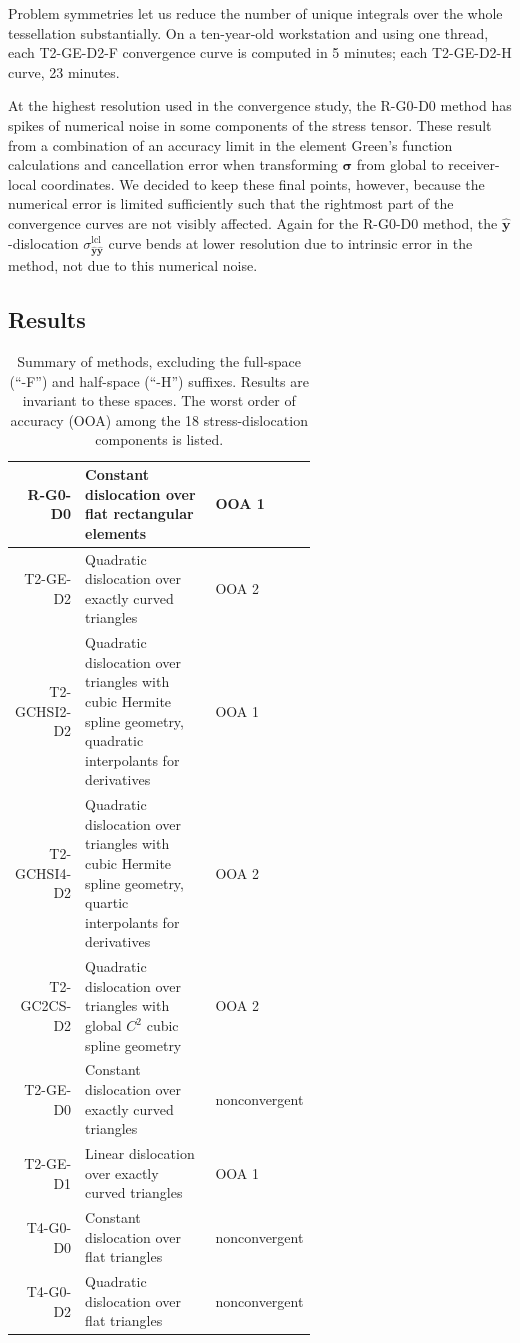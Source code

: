 \documentclass[11pt]{article}
\newcommand{\uvec}[1]{\hat{\boldsymbol{#1}}}
\newcommand{\mat}[1]{\boldsymbol{#1}}
\newcommand{\suplcl}[1]{#1^{\mathrm{lcl}}}
\begin{document}
Problem symmetries let us reduce the number of unique integrals
over the whole tessellation substantially.
On a ten-year-old workstation and using one thread,
each T2-GE-D2-F convergence curve is computed in 5 minutes;
each T2-GE-D2-H curve, 23 minutes.

At the highest resolution used in the convergence study,
the R-G0-D0 method has spikes of numerical noise in some components of the stress tensor.
These result from a combination of an accuracy limit in the element Green's function calculations
and cancellation error when transforming $\mat{\sigma}$ from global to receiver-local coordinates.
We decided to keep these final points, however,
because the numerical error is limited sufficiently such that
the rightmost part of the convergence curves are not visibly affected.
Again for the R-G0-D0 method,
the $\uvec{y}$-dislocation $\suplcl{\sigma}_{\uvec{y}\uvec{y}}$ curve bends at lower resolution due to intrinsic error in the method,
not due to this numerical noise.

\subsection{Results}

\begin{table}
\centering
\begin{tabular}{r|p{0.6\linewidth}|l}
R-G0-D0 & Constant dislocation over flat rectangular elements & OOA 1 \\
\hline
T2-GE-D2 & Quadratic dislocation over exactly curved triangles & OOA 2 \\
\hline
T2-GCHSI2-D2 & Quadratic dislocation over triangles with cubic Hermite spline geometry, quadratic interpolants for derivatives & OOA 1 \\
\hline
T2-GCHSI4-D2 & Quadratic dislocation over triangles with cubic Hermite spline geometry, quartic interpolants for derivatives & OOA 2 \\
\hline
T2-GC2CS-D2 & Quadratic dislocation over triangles with global $C^2$ cubic spline geometry & OOA 2 \\
\hline
T2-GE-D0 & Constant dislocation over exactly curved triangles & nonconvergent  \\
\hline
T2-GE-D1 & Linear dislocation over exactly curved triangles & OOA 1  \\
\hline
T4-G0-D0 & Constant dislocation over flat triangles & nonconvergent \\
\hline
T4-G0-D2 & Quadratic dislocation over flat triangles & nonconvergent
\end{tabular}
\caption{
  Summary of methods, excluding the full-space (``-F'') and half-space (``-H'') suffixes.
  Results are invariant to these spaces.
  The worst order of accuracy (OOA) among the 18 stress-dislocation components is listed.
}
\label{tbl:nomen}
\end{table}
\end{document}
